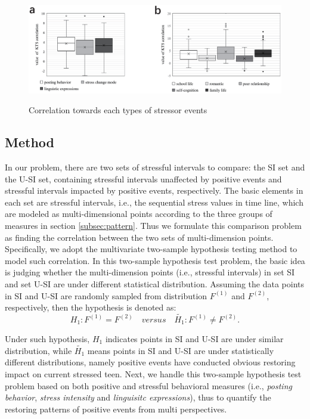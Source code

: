 \begin{figure}
\centering
\caption{Correlation towards each types of stressor events}
\includegraphics[width=0.8\linewidth]{figs/BOX.eps}%
\label{fig:correlation}
\end{figure}

\subsection{Method}
In our problem,
there are two sets of stressful intervals to compare:
the SI set and the U-SI set,
containing stressful intervals unaffected by positive events
and stressful intervals impacted by positive events, respectively.
The basic elements in each set are stressful intervals,
i.e., the sequential stress values in time line,
which are modeled as multi-dimensional points according to the three groups of measures in section \ref{subsec:pattern}.
Thus we formulate this comparison problem as finding the correlation between the two sets of multi-dimension points.
Specifically, we adopt the multivariate two-sample hypothesis testing method
\cite{Li2017Correlating,Johnson2012Applied} to model such correlation.
In this two-sample hypothesis test problem,
the basic idea is judging whether the multi-dimension points (i.e., stressful intervals)
in set SI and set U-SI are under different statistical distribution.
Assuming the data points in SI and U-SI are randomly sampled from distribution $F^{(1)}$ and $F^{(2)}$, respectively,
then the hypothesis is denoted as:
\begin{equation}
H_1: F^{(1)} =F^{(2)} \quad versus \quad \widetilde{H_1}: F^{(1)} \neq F^{(2)}.
\end{equation}

Under such hypothesis,
$H_1$ indicates points in SI and U-SI are under similar distribution,
while $\widetilde{H_1}$ means points in SI and U-SI are under statistically different distributions,
namely positive events have conducted obvious restoring impact on current stressed teen.
Next, we handle this two-sample hypothesis test problem based on both positive and stressful behavioral measures
(i.e., \emph{posting behavior}, \emph{stress intensity} and \emph{linguisitc expressions}),
thus to quantify the restoring patterns of positive events from multi perspectives.

